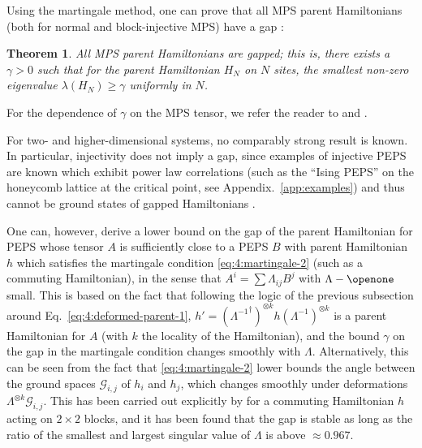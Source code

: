 \documentclass[rmp,aps,reprint,superscriptaddress,nobalancelastpage]{revtex4-1}
\newtheorem{thm}{Theorem}[section]
\begin{document}
Using the martingale method, one can prove that all MPS parent Hamiltonians (both for normal and block-injective MPS) have a gap \cite{fannes:FCS,nachtergaele:degen-mps}:
\begin{thm}
    All MPS parent Hamiltonians are gapped; this is, there exists a $\gamma>0$ such that for the parent Hamiltonian $H_N$ on $N$ sites, the smallest non-zero eigenvalue $\lambda(H_N)\ge \gamma$ uniformly in $N$.
\end{thm}
For the dependence of $\gamma$ on the MPS tensor, we refer the reader to \citet*{fannes:FCS} and \textcite{nachtergaele:degen-mps}.

For two- and higher-dimensional systems, no comparably strong result is known. In particular, injectivity does not imply a gap, since examples of injective PEPS are known which exhibit power law correlations (such as the ``Ising PEPS'' \cite{verstraete:comp-power-of-peps} on the honeycomb lattice at the critical point, see Appendix.~\ref{app:examples}) and thus cannot be ground states of gapped Hamiltonians \cite{hastings:gap-and-expdecay,nachtergaele:exp-clustering}.

One can, however, derive a lower bound on the gap of the parent Hamiltonian for PEPS whose tensor $A$ is sufficiently close to a PEPS $B$ with parent Hamiltonian $h$ which satisfies the martingale condition \eqref{eq:4:martingale-2} (such as a commuting Hamiltonian), in the sense that $A^i=\sum\Lambda_{ij} B^j$ with $\Lambda-\openone$ small. This is based on the fact that following the logic of the previous subsection around Eq.~\eqref{eq:4:deformed-parent-1}, $h'=({\Lambda^{-1}}^\dagger)^{\otimes k}h(\Lambda^{-1})^{\otimes k}$ is a parent Hamiltonian for $A$ (with $k$ the locality of the Hamiltonian), and the bound $\gamma$ on the gap in the martingale condition changes smoothly with $\Lambda$. Alternatively, this can be seen from the fact that \eqref{eq:4:martingale-2} lower bounds the angle between the ground spaces $\mathcal G_{i,j}$ of $h_i$ and $h_j$, which changes smoothly under deformations $\Lambda^{\otimes k}\mathcal G_{i,j}$. This has been carried out explicitly by \textcite[][Appendix E]{schuch:mps-phases} for a commuting Hamiltonian $h$ acting on $2\times 2$ blocks, and it has been found that the gap is stable as long as the ratio of the smallest and largest singular value of $\Lambda$ is above $\approx 0.967$.
\end{document}
